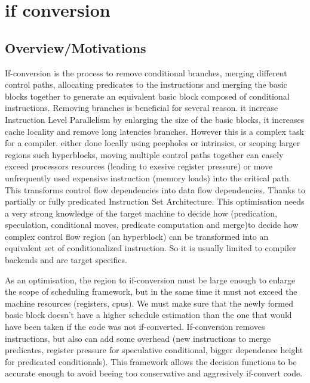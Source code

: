 \chapter{if conversion }
\graphicspath{{img/}{/if_conversion/img}{part4/if_conversion/img/}}

\newcommand\cond{~?~}

\section{Overview/Motivations}

If-conversion is the process to remove conditional branches, merging different control paths, allocating predicates to the instructions and merging the basic blocks together to generate an equivalent basic block composed of conditional instructions.
Removing branches is beneficial for several reason. it increase Instruction Level Parallelism by enlarging the size of the basic blocks, it increases cache locality and remove long latencies branches. However this is a complex task for a compiler. either done locally using peepholes or intrinsics, or scoping larger regions such hyperblocks, moving multiple control paths together can easely exceed processors resources (leading to exesive register pressure) or move unfrequently used expensive instruction (memory loads) into the critical path. 
This transforms control flow dependencies into data flow dependencies.
Thanks to partially or fully predicated Instruction Set Architecture. 
This optimisation needs a very strong knowledge of the target machine to decide how (predication, speculation, conditional moves, predicate computation and merge)to decide how complex control flow region (an hyperblock) can be transformed into an equivalent set of conditionalized instruction. So it is usually limited to compiler backends and are target specifics.

As an optimisation, the region to if-conversion must be large enough to enlarge the scope of scheduling framework, but in the same time it must not exceed the machine resources (registers, cpus). We must make sure that the newly formed basic block doesn't have a higher schedule estimation than the one that would have been taken if the code was not if-converted. If-conversion removes instructions, but also can add some overhead (new instructions to merge predicates, register pressure for speculative conditional, bigger dependence height for predicated conditionals). This framework allows the decision functions to be accurate enough to avoid beeing too conservative and aggresively if-convert code. 

